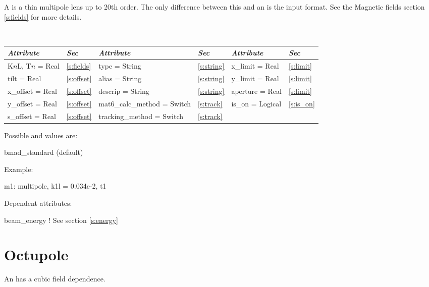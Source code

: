 A  is a thin multipole lens up to 20th order. The only
difference between this and an  is the input format. See the 
Magnetic fields section \ref{s:fields} for more details.

\begin{table}[h]
\centering 
{\tt
\begin{tabular}{|l|l||l|l||l|l|} \hline
  {\sl Attribute} & {\sl Sec}  & {\sl Attribute} & {\sl Sec} & {\sl Attribute} & {\sl Sec} \\ \hline
  K$n$L, T$n$ = Real &  \ref{s:fields} &  type = String                & \ref{s:string} & x\_limit = Real  & \ref{s:limit} \\ \hline
  tilt       = Real  &  \ref{s:offset} &  alias = String               & \ref{s:string} & y\_limit = Real  & \ref{s:limit} \\ \hline
  x\_offset  = Real  &  \ref{s:offset} &  descrip = String             & \ref{s:string} & aperture = Real  & \ref{s:limit} \\ \hline
  y\_offset  = Real  &  \ref{s:offset} &  mat6\_calc\_method = Switch  & \ref{s:track}  & is\_on = Logical & \ref{s:is_on} \\ \hline
  s\_offset  = Real  &  \ref{s:offset} &  tracking\_method = Switch    & \ref{s:track}  &                  &               \\ \hline
\end{tabular}
}
\end{table}

\noindent
Possible  and  values are:
\vskip 0.01in
\begin{example}
   bmad\_standard  (default) 
\end{example}

\vskip0.2in \noindent
Example:
\begin{example}
  m1: multipole, k1l = 0.034e-2, t1
\end{example}

\vskip0.1in \noindent
Dependent attributes:
\begin{example}
  beam\_energy  ! See section \ref{s:energy}
\end{example}


\section{Octupole}
\label{s:oct}

An  has a cubic field dependence.

